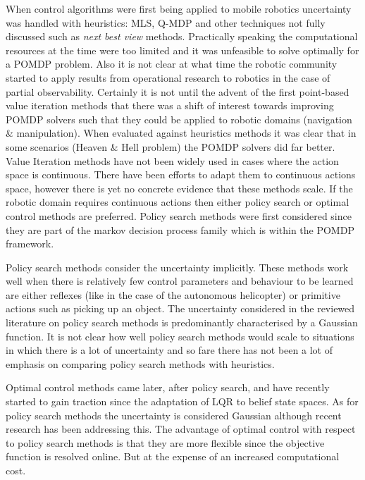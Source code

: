 When control algorithms were first being applied to mobile robotics uncertainty was handled with heuristics: 
MLS, Q-MDP and other techniques not fully discussed such as \textit{next best view} methods. Practically speaking 
the computational resources at the time were too limited and it was unfeasible to solve optimally for a POMDP problem. 
Also it is not clear at what time the robotic community started to apply results from operational research to robotics
in the case of partial observability.
Certainly it is not until the advent of the first point-based value iteration methods that there was a shift of interest 
towards improving POMDP solvers such that they could be applied to robotic domains (navigation \& manipulation). 
When evaluated against heuristics methods it was clear that in some scenarios (Heaven \& Hell problem) 
the POMDP solvers did far better. Value Iteration methods have not been widely used in cases where the action space 
is continuous. There have been efforts to adapt them to continuous actions space, however there is yet no concrete evidence 
that these methods scale. If the robotic domain requires continuous actions then either policy search or optimal control 
methods are preferred. Policy search methods were first considered since they are part of the markov decision process 
family which is within the POMDP framework.

Policy search methods consider the uncertainty implicitly. These methods work 
well when there is relatively few control parameters and behaviour to be learned are either reflexes (like in the case of 
the autonomous helicopter) or primitive actions such as picking up an object. The uncertainty considered 
in the reviewed literature on policy search methods is predominantly characterised by a Gaussian function. It is not clear 
how well policy search methods would scale to situations in which there is a lot of uncertainty and so fare there has not 
been a lot of emphasis on comparing policy search methods with heuristics. 

Optimal control methods came later, after policy search, and have recently started to gain traction since the adaptation 
of LQR to belief state spaces. As for policy search methods the uncertainty is considered Gaussian although recent research 
has been addressing this. The advantage of optimal control with respect to policy search methods is that they are more 
flexible since the objective function is resolved online. But at the expense of an increased computational cost.

